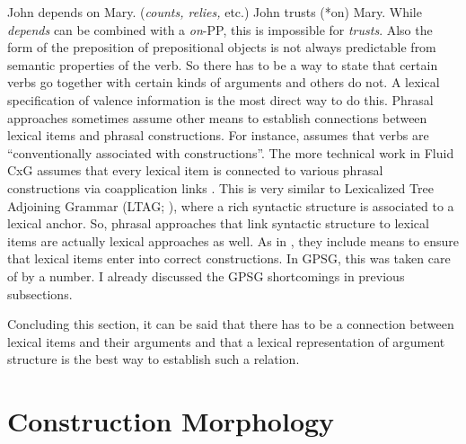 \documentclass[output=paper,biblatex,babelshorthands,newtxmath,draftmode,colorlinks,citecolor=brown]{langscibook}
\begin{document}
\eal\label{depends-on-ex}
\ex John depends on Mary.  (\emph{counts, relies,} etc.)
\ex John trusts (*on) Mary.
\zl
While \emph{depends} can be combined with a \emph{on}-PP, this is impossible for \emph{trusts}. Also
the form of the preposition of prepositional objects is not always predictable from semantic
properties of the verb. So there has to be a way to state that certain verbs go together with
certain kinds of arguments and others do not. A lexical specification of valence information is the
most direct way to do this. Phrasal approaches sometimes assume other means to establish connections
between lexical items and phrasal constructions. For instance, \citet[]{Goldberg95a} assumes
that verbs are ``conventionally associated with constructions''. The more technical work in Fluid
CxG assumes that every lexical item is connected to various phrasal constructions via coapplication
links \citep[]{vanTrijp2011a}. This is very similar to Lexicalized Tree Adjoining
Grammar
(LTAG; \citealt*{SAJ88a-u}), where a rich syntactic structure is associated to a lexical anchor. So,
phrasal approaches that link syntactic structure to lexical items are actually lexical
approaches as well. As in \gpsg, they include means to ensure that lexical items enter into correct
constructions. In GPSG, this was taken care of by a number. I already discussed the GPSG shortcomings
in previous subsections.

Concluding this section, it can be said that there has to be a connection between lexical items and
their arguments and that a lexical representation of argument structure is the best way to establish
such a relation.


\section{Construction Morphology}
\label{sec-cxg-morphology}\label{cxg:sec-cxg-morphology}
\end{document}
